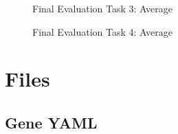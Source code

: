 \begin{figure}[!h]
  \centering
  \begin{minipage}[b]{0.47\textwidth}
    \caption{Final Evaluation Task 3: Average}
  \end{minipage}
  \hfill
  \begin{minipage}[b]{0.47\textwidth}
  \caption{Final Evaluation Task 4: Average}
  \end{minipage}
\end{figure}

\chapter{Files}

\newpage
\section{Gene YAML}\label{sec:geneYAML}

